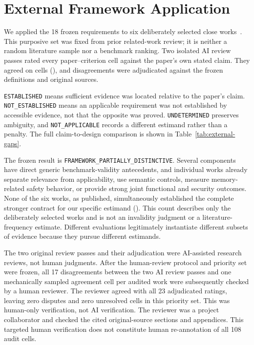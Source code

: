 \section{External Framework Application}
\label{sec:external}

We applied the 18 frozen requirements to six deliberately selected close
works~\cite{lin2026basm,dong2026harmfulskills,chen2026slbench,han2026sweskills,zhao2026safetyrisks,chen2026securevibebench}.
This purposive set was fixed from prior related-work review; it is neither a
random literature sample nor a benchmark ranking.  Two isolated AI review
passes rated every paper--criterion cell against the paper's own stated claim.
They agreed on \ExternalAgreement{} cells
(\ExternalAgreementPercent{}), and \ExternalAdjudicated{} disagreements were
adjudicated against the frozen definitions and original sources.



\texttt{ESTABLISHED} means sufficient evidence was located relative to the
paper's claim.  \texttt{NOT\_ESTABLISHED} means an applicable requirement was
not established by accessible evidence, not that the opposite was proved.
\texttt{UNDETERMINED} preserves ambiguity, and
\texttt{NOT\_APPLICABLE} records a different estimand rather than a penalty.
The full claim-to-design comparison is shown in
Table~\ref{tab:external-gaps}.



The frozen result is \texttt{FRAMEWORK\_PARTIALLY\_DISTINCTIVE}.  Several
components have direct generic benchmark-validity antecedents, and individual
works already separate relevance from applicability, use semantic controls,
measure memory-related safety behavior, or provide strong joint functional and
security outcomes.  None of the six works, as published, simultaneously
established the complete stronger contract for our specific estimand
(\ExternalFullContract{}).  This count describes only the deliberately
selected works and is not an invalidity judgment or a literature-frequency
estimate.  Different evaluations legitimately instantiate different subsets
of evidence because they pursue different estimands.

The two original review passes and their adjudication were AI-assisted research
reviews, not human judgments.  After the human-review protocol and priority set
were frozen, all 17 disagreements between the two AI review passes and one
mechanically sampled agreement cell per audited work were subsequently checked
by a human reviewer.  The reviewer agreed with all 23 adjudicated ratings,
leaving zero disputes and zero unresolved cells in this priority set.  This was
human-only verification, not AI verification.  The reviewer was a project
collaborator and checked the cited original-source sections and appendices.
This targeted human verification does not constitute human re-annotation of
all 108 audit cells.
